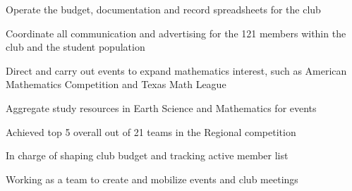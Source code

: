 \documentclass[letterpaper]{kathy-resume} %
\begin{document}
\begin{minipage}[t]{0.64\textwidth}
\sectionspace %





\begin{tightitemize}
\item Operate the budget, documentation and record spreadsheets for the club
\item Coordinate all communication and advertising for the 121 members within the club and the student population
\item Direct and carry out events to expand mathematics interest, such as American Mathematics Competition and Texas Math League
\end{tightitemize}

\sectionspace %



\begin{tightitemize}
\item Aggregate study resources in Earth Science and Mathematics for events
\item Achieved top 5 overall out of 21 teams in the Regional competition  
\end{tightitemize}

\sectionspace %



\begin{tightitemize}
\item In charge of shaping club budget and tracking active member list
\item Working as a team to create and mobilize events and club meetings
\end{tightitemize}

\sectionspace %



\end{minipage}
\end{document}
